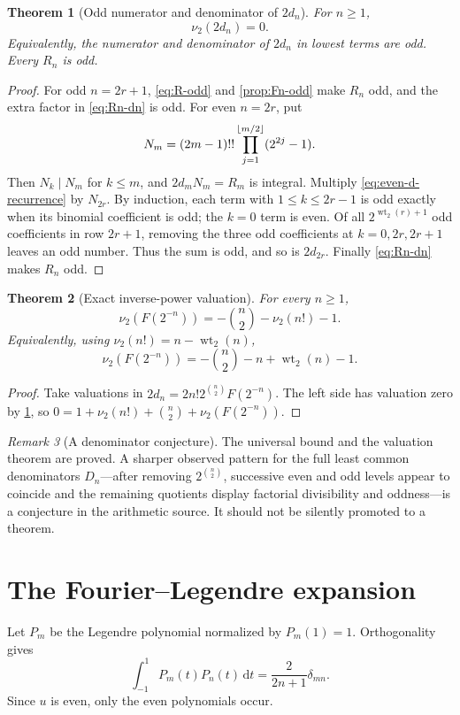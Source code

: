\documentclass[11pt]{article}
\newtheorem{theorem}{Theorem}[section]
\theoremstyle{definition}
\theoremstyle{remark}
\newtheorem{remark}[theorem]{Remark}
\newcommand{\wt}{\operatorname{wt}_2}\newcommand{\upfun}{\operatorname{up}}
\newcommand{\dd}{\,\mathrm d}\newcommand{\e}{\mathrm e}\newcommand{\ii}{\mathrm i}
\begin{document}
\begin{theorem}[Odd numerator and denominator of $2d_n$]\label{thm:two-d-odd}
For $n\ge1$,
\begin{equation}\label{eq:two-d-valuation}
 \nu_2(2d_n)=0.
\end{equation}
Equivalently, the numerator and denominator of $2d_n$ in lowest terms are odd.  Every $R_n$ is odd.
\end{theorem}
\begin{proof}
For odd $n=2r+1$, \eqref{eq:R-odd} and \cref{prop:Fn-odd} make $R_n$ odd, and the extra factor in \eqref{eq:Rn-dn} is odd.  For even $n=2r$, put
\[
 N_m=(2m-1)!!\prod_{j=1}^{\left\lfloor m/2\right\rfloor}(2^{2j}-1).
\]
Then $N_k\mid N_m$ for $k\le m$, and $2d_mN_m=R_m$ is integral.  Multiply \eqref{eq:even-d-recurrence} by $N_{2r}$.  By induction, each term with $1\le k\le2r-1$ is odd exactly when its binomial coefficient is odd; the $k=0$ term is even.  Of all $2^{\wt(r)+1}$ odd coefficients in row $2r+1$, removing the three odd coefficients at $k=0,2r,2r+1$ leaves an odd number.  Thus the sum is odd, and so is $2d_{2r}$.  Finally \eqref{eq:Rn-dn} makes $R_n$ odd.
\end{proof}

\begin{theorem}[Exact inverse-power valuation]\label{thm:valuation}
For every $n\ge1$,
\begin{equation}\label{eq:valuation}
\boxed{
 \nu_2(F(2^{-n}))=-\binom n2-\nu_2(n!)-1.}
\end{equation}
Equivalently, using $\nu_2(n!)=n-\wt(n)$,
\[
 \nu_2(F(2^{-n}))=-\binom n2-n+\wt(n)-1.
\]
\end{theorem}
\begin{proof}
Take valuations in $2d_n=2n!2^{\binom n2}F(2^{-n})$.  The left side has valuation zero by \cref{thm:two-d-odd}, so
$0=1+\nu_2(n!)+\binom n2+\nu_2(F(2^{-n}))$.
\end{proof}

\begin{remark}[A denominator conjecture]
The universal bound and the valuation theorem are proved.  A sharper observed pattern for the full least common denominators $D_n$---after removing $2^{\binom n2}$, successive even and odd levels appear to coincide and the remaining quotients display factorial divisibility and oddness---is a conjecture in the arithmetic source.  It should not be silently promoted to a theorem.
\end{remark}

\section{The Fourier--Legendre expansion}\label{sec:legendre}
Let $P_m$ be the Legendre polynomial normalized by $P_m(1)=1$.  Orthogonality gives
\[
 \int_{-1}^{1}P_m(t)P_n(t)\dd t=\frac{2}{2n+1}\delta_{mn}.
\]
Since $u$ is even, only the even polynomials occur.
\end{document}
